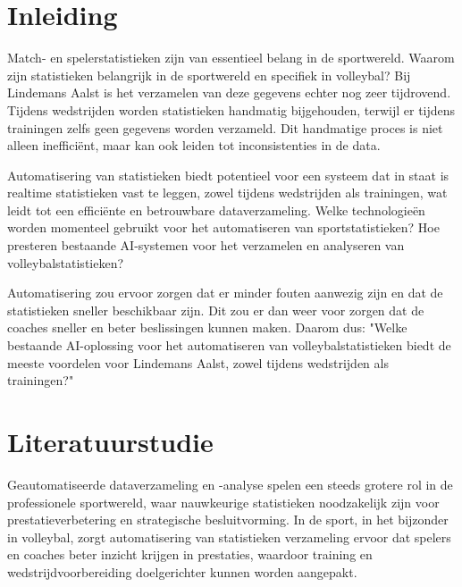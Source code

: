 
\section{Inleiding}%
\label{sec:inleiding}

Match- en spelerstatistieken zijn van essentieel belang in de sportwereld. Waarom zijn statistieken belangrijk in de sportwereld en specifiek in volleybal? Bij Lindemans Aalst is het verzamelen van deze gegevens echter nog zeer tijdrovend. Tijdens wedstrijden worden statistieken handmatig bijgehouden, terwijl er tijdens trainingen zelfs geen gegevens worden verzameld. Dit handmatige proces is niet alleen inefficiënt, maar kan ook leiden tot inconsistenties in de data.

Automatisering van statistieken biedt potentieel voor een systeem dat in staat is realtime statistieken vast te leggen, zowel tijdens wedstrijden als trainingen, wat leidt tot een efficiënte en betrouwbare dataverzameling. Welke technologieën worden momenteel gebruikt voor het automatiseren van sportstatistieken? Hoe presteren bestaande AI-systemen voor het verzamelen en analyseren van volleybalstatistieken?

Automatisering zou ervoor zorgen dat er minder fouten aanwezig zijn en dat de statistieken sneller beschikbaar zijn. Dit zou er dan weer voor zorgen dat de coaches sneller en beter beslissingen kunnen maken. Daarom dus: "Welke bestaande AI-oplossing voor het automatiseren van volleybalstatistieken biedt de meeste voordelen voor Lindemans Aalst, zowel tijdens wedstrijden als trainingen?"

\section{Literatuurstudie}%
\label{sec:literatuurstudie}
Geautomatiseerde dataverzameling en -analyse spelen een steeds grotere rol in de professionele sportwereld, waar nauwkeurige statistieken noodzakelijk zijn voor prestatieverbetering en strategische besluitvorming. In de sport, in het bijzonder in volleybal, zorgt automatisering van statistieken verzameling ervoor dat spelers en coaches beter inzicht krijgen in prestaties, waardoor training en wedstrijdvoorbereiding doelgerichter kunnen worden aangepakt.
